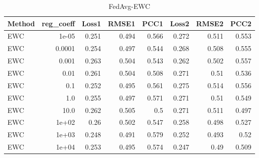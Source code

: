 \begin{table}
\caption{FedAvg-EWC}
\begin{tabular}{lrrrrrrr}
\toprule
Method & reg_coeff & Loss1 & RMSE1 & PCC1 & Loss2 & RMSE2 & PCC2 \\
\midrule
EWC & 1e-05 & 0.251 & 0.494 & 0.566 & 0.272 & 0.511 & 0.553 \\
EWC & 0.0001 & 0.254 & 0.497 & 0.544 & 0.268 & 0.508 & 0.555 \\
EWC & 0.001 & 0.263 & 0.504 & 0.543 & 0.262 & 0.502 & 0.557 \\
EWC & 0.01 & 0.261 & 0.504 & 0.508 & 0.271 & 0.51 & 0.536 \\
EWC & 0.1 & 0.252 & 0.495 & 0.561 & 0.275 & 0.514 & 0.556 \\
EWC & 1.0 & 0.255 & 0.497 & 0.571 & 0.271 & 0.51 & 0.549 \\
EWC & 10.0 & 0.262 & 0.505 & 0.5 & 0.271 & 0.511 & 0.497 \\
EWC & 1e+02 & 0.26 & 0.502 & 0.547 & 0.258 & 0.498 & 0.527 \\
EWC & 1e+03 & 0.248 & 0.491 & 0.579 & 0.252 & 0.493 & 0.52 \\
EWC & 1e+04 & 0.253 & 0.495 & 0.574 & 0.247 & 0.49 & 0.509 \\
\bottomrule
\end{tabular}
\end{table}
